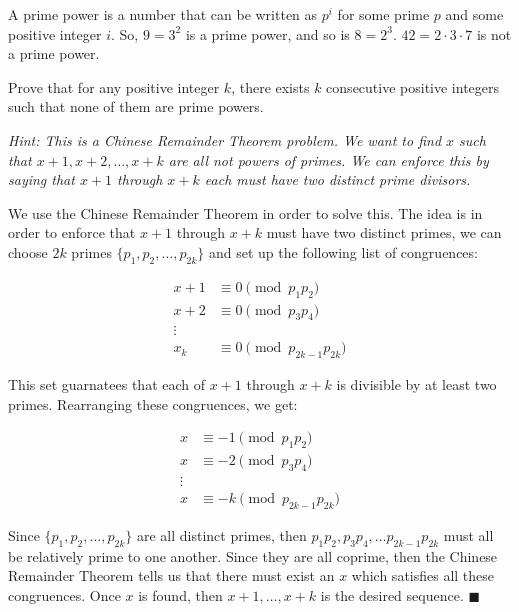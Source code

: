 \documentclass[11pt]{article}
\begin{document}
\pagebreak
{}

A prime power is a number that can be written as $p^i$ for some prime $p$ and some
positive integer $i$. So, $9 = 3^2$ is a prime power, and so is $8 = 2^3$. $42 = 2 \cdot 3 \cdot 7$ is not
a prime power.

Prove that for any positive integer $k$, there exists $k$ consecutive positive integers
such that none of them are prime powers.

\emph{Hint: This is a Chinese Remainder Theorem problem. We want to find $x$ such that $x + 1, x + 2, \ldots, x+k$ are all not powers of primes. We can enforce this by saying that $x+1$ through $x+k$ each must have two distinct prime divisors.}


\begin{solution}
  We use the Chinese Remainder Theorem in order to solve this. The idea is in order to enforce that $x+1$ through $x+k$ must have two distinct primes, we can choose $2k$ primes $\{p_1, p_2, \dots, p_{2k}\}$ and set up the following list of congruences: 

  \begin{align*}
    x+1 &\equiv 0 \pmod{p_1p_2}\\
    x+2 &\equiv 0 \pmod{p_3p_4}\\
    \vdots\\
    x_k &\equiv 0 \pmod{p_{2k - 1}p_{2k}}
  \end{align*}

  This set guarnatees that each of $x+1$ through $x+k$ is divisible by at least two primes. Rearranging these congruences, we get: 

  \begin{align*}
    x &\equiv -1 \pmod{p_1p_2}\\
    x &\equiv -2 \pmod{p_3p_4}\\
    \vdots\\
    x &\equiv -k \pmod{p_{2k - 1}p_{2k}}
  \end{align*} 

  Since $\{p_1, p_2, \dots, p_{2k}\}$ are all distinct primes, then $p_1p_2, p_3p_4, \dots p_{2k-1}p_{2k}$ must all be relatively prime to one another. Since they are all coprime, then the Chinese Remainder Theorem tells us that there must exist an $x$ which satisfies all these congruences. Once $x$ is found, then $x+1, \dots, x+k$ is the desired sequence. $\blacksquare$

  

\end{solution}
\end{document}
